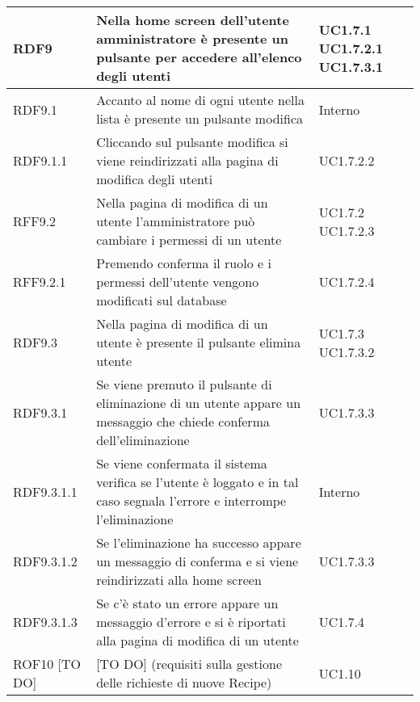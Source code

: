 \begin{center}
\begin{longtable}{| p{2.5cm} | p{8cm} | p{2cm} |}
		RDF9 & Nella home screen dell'utente amministratore è presente un pulsante per accedere all'elenco degli utenti  &  UC1.7.1 \newline UC1.7.2.1 \newline UC1.7.3.1 \\
		\hline
		RDF9.1  &  Accanto al nome di ogni utente nella lista è presente un pulsante modifica  &  Interno \\
		\hline
		RDF9.1.1  &  Cliccando sul pulsante modifica si viene reindirizzati alla pagina di modifica degli utenti  &  UC1.7.2.2 \\
		\hline
		RFF9.2  &  Nella pagina di modifica di un utente l'amministratore può cambiare i permessi di un utente  &  UC1.7.2 \newline UC1.7.2.3 \\
		\hline
		RFF9.2.1  &  Premendo conferma il ruolo e i permessi dell'utente vengono modificati sul database  &  UC1.7.2.4 \\
		\hline
		RDF9.3  &  Nella pagina di modifica di un utente è presente il pulsante elimina utente  &  UC1.7.3 \newline UC1.7.3.2 \\
		\hline
		RDF9.3.1  &  Se viene premuto il pulsante di eliminazione di un utente appare un messaggio che chiede conferma dell'eliminazione  & UC1.7.3.3\\
		\hline
		RDF9.3.1.1  &  Se viene confermata il sistema verifica se l'utente è loggato e in tal caso segnala l'errore e interrompe l'eliminazione  & Interno \\
		\hline
		RDF9.3.1.2  &  Se l'eliminazione ha successo appare un messaggio di conferma e si viene reindirizzati alla home screen  & UC1.7.3.3\\
		\hline
		RDF9.3.1.3  &  Se c'è stato un errore appare un messaggio d'errore e si è riportati alla pagina di modifica di un utente  & UC1.7.4\\
		\hline



		ROF10 [TO DO] &  [TO DO] (requisiti sulla gestione delle richieste di nuove Recipe)  & UC1.10 \\
		\hline




\end{longtable}
\end{center}
